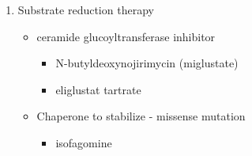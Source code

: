 \documentclass{scrartcl}
\begin{document}
\begin{enumerate}
\begin{enumerate}
\item Substrate reduction therapy
\label{sec:org8b227f8}
\begin{itemize}
\item ceramide glucoyltransferase inhibitor
\begin{itemize}
\item N-butyldeoxynojirimycin (miglustate)
\item eliglustat tartrate
\end{itemize}
\item Chaperone to stabilize - missense mutation
\begin{itemize}
\item isofagomine
\end{itemize}
\end{itemize}
\end{enumerate}
\end{enumerate}
\end{document}
